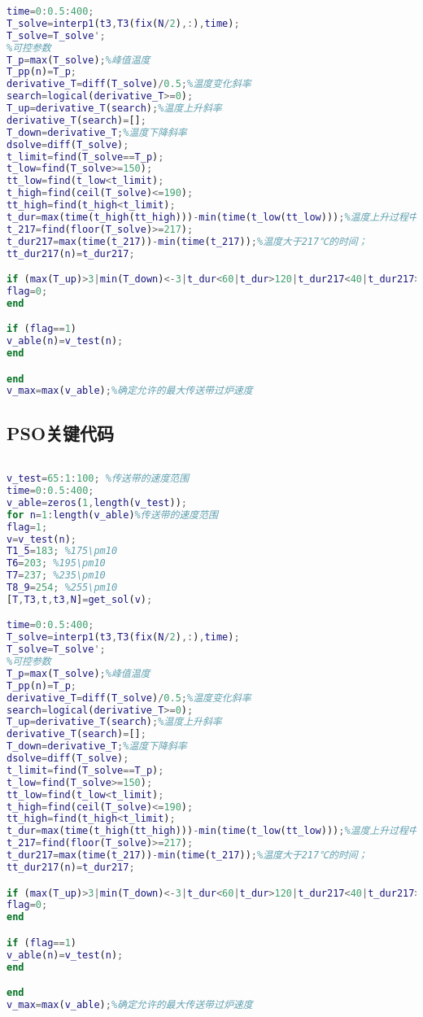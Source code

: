 \documentclass[withoutpreface,bwprint]{cumcmthesis} %
\begin{document}
\begin{appendices}
\begin{lstlisting}[language=matlab]
time=0:0.5:400;
T_solve=interp1(t3,T3(fix(N/2),:),time);
T_solve=T_solve';
%可控参数
T_p=max(T_solve);%峰值温度
T_pp(n)=T_p;
derivative_T=diff(T_solve)/0.5;%温度变化斜率
search=logical(derivative_T>=0);
T_up=derivative_T(search);%温度上升斜率
derivative_T(search)=[];
T_down=derivative_T;%温度下降斜率
dsolve=diff(T_solve);
t_limit=find(T_solve==T_p);
t_low=find(T_solve>=150);
tt_low=find(t_low<t_limit);
t_high=find(ceil(T_solve)<=190);
tt_high=find(t_high<t_limit);
t_dur=max(time(t_high(tt_high)))-min(time(t_low(tt_low)));%温度上升过程中在150℃-190℃的时间
t_217=find(floor(T_solve)>=217);
t_dur217=max(time(t_217))-min(time(t_217));%温度大于217℃的时间；
tt_dur217(n)=t_dur217;

if (max(T_up)>3|min(T_down)<-3|t_dur<60|t_dur>120|t_dur217<40|t_dur217>90|T_p<240|T_p>250)
flag=0;
end

if (flag==1)
v_able(n)=v_test(n);
end

end
v_max=max(v_able);%确定允许的最大传送带过炉速度
\end{lstlisting}

\subsection{PSO关键代码}
\begin{lstlisting}[language=matlab]

v_test=65:1:100; %传送带的速度范围
time=0:0.5:400;
v_able=zeros(1,length(v_test));
for n=1:length(v_able)%传送带的速度范围
flag=1;
v=v_test(n);
T1_5=183; %175\pm10
T6=203; %195\pm10
T7=237; %235\pm10
T8_9=254; %255\pm10
[T,T3,t,t3,N]=get_sol(v);

time=0:0.5:400;
T_solve=interp1(t3,T3(fix(N/2),:),time);
T_solve=T_solve';
%可控参数
T_p=max(T_solve);%峰值温度
T_pp(n)=T_p;
derivative_T=diff(T_solve)/0.5;%温度变化斜率
search=logical(derivative_T>=0);
T_up=derivative_T(search);%温度上升斜率
derivative_T(search)=[];
T_down=derivative_T;%温度下降斜率
dsolve=diff(T_solve);
t_limit=find(T_solve==T_p);
t_low=find(T_solve>=150);
tt_low=find(t_low<t_limit);
t_high=find(ceil(T_solve)<=190);
tt_high=find(t_high<t_limit);
t_dur=max(time(t_high(tt_high)))-min(time(t_low(tt_low)));%温度上升过程中在150℃-190℃的时间
t_217=find(floor(T_solve)>=217);
t_dur217=max(time(t_217))-min(time(t_217));%温度大于217℃的时间；
tt_dur217(n)=t_dur217;

if (max(T_up)>3|min(T_down)<-3|t_dur<60|t_dur>120|t_dur217<40|t_dur217>90|T_p<240|T_p>250)
flag=0;
end

if (flag==1)
v_able(n)=v_test(n);
end

end
v_max=max(v_able);%确定允许的最大传送带过炉速度
\end{lstlisting}
\end{appendices}
\end{document}
